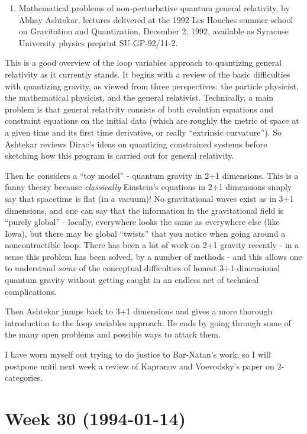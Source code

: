 \documentclass{article}
\def\tightlist{}
\begin{document}
\begin{enumerate}
\def\labelenumi{\arabic{enumi})}
\setcounter{enumi}{1}
\tightlist
\item
  Mathematical problems of non-perturbative quantum general relativity,
  by Abhay Ashtekar, lectures delivered at the 1992 Les Houches summer
  school on Gravitation and Quantization, December 2, 1992, available as
  Syracuse University physics preprint SU-GP-92/11-2.
\end{enumerate}

This is a good overview of the loop variables approach to quantizing
general relativity as it currently stands. It begins with a review of
the basic difficulties with quantizing gravity, as viewed from three
perspectives: the particle physicist, the mathematical physicist, and
the general relativist. Technically, a main problem is that general
relativity consists of both evolution equations and constraint equations
on the initial data (which are roughly the metric of space at a given
time and its first time derivative, or really ``extrinsic curvature'').
So Ashtekar reviews Dirac's ideas on quantizing constrained systems
before sketching how this program is carried out for general relativity.

Then he considers a ``toy model'' - quantum gravity in 2+1 dimensions.
This is a funny theory because \emph{classically} Einstein's equations
in 2+1 dimensions simply say that spacetime is flat (in a vacuum)! No
gravitational waves exist as in 3+1 dimensions, and one can say that the
information in the gravitational field is ``purely global'' - locally,
everywhere looks the same as everywhere else (like Iowa), but there may
be global ``twists'' that you notice when going around a noncontractible
loop. There has been a lot of work on 2+1 gravity recently - in a sense
this problem has been solved, by a number of methods - and this allows
one to understand \emph{some} of the conceptual difficulties of honest
3+1-dimensional quantum gravity without getting caught in an endless net
of technical complications.

Then Ashtekar jumps back to 3+1 dimensions and gives a more thorough
introduction to the loop variables approach. He ends by going through
some of the many open problems and possible ways to attack them.

I have worn myself out trying to do justice to Bar-Natan's work, so I
will postpone until next week a review of Kapranov and Voevodsky's paper
on 2-categories.
\hypertarget{week-30-1994-01-14}{%
\section{Week 30 (1994-01-14)}\label{week-30-1994-01-14}}
\end{document}
